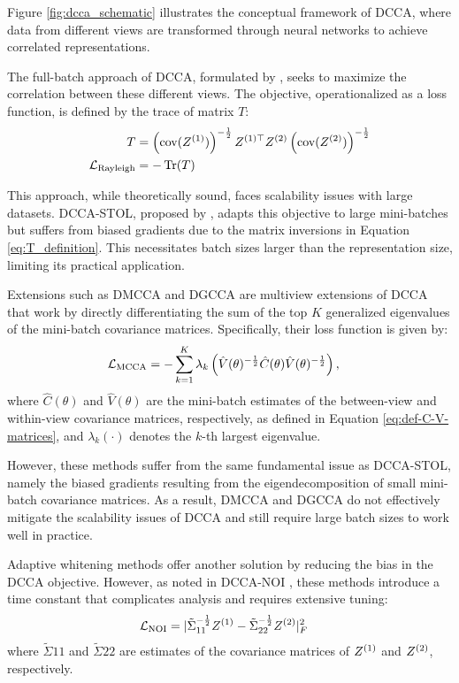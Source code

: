 Figure \ref{fig:dcca_schematic} illustrates the conceptual framework of DCCA, where data from different views are transformed through neural networks to achieve correlated representations.

The full-batch approach of DCCA, formulated by \citet{andrew2013deep}, seeks to maximize the correlation between these different views.
The objective, operationalized as a loss function, is defined by the trace of matrix $T$:
\begin{align}\label{eq:T_definition}
T &= \left(\text{cov}(Z^{(1)})\right)^{-\frac{1}{2}} Z^{(1)\top} Z^{(2)} \left(\text{cov}(Z^{(2)})\right)^{-\frac{1}{2}} \\
\mathcal{L}_\text{Rayleigh} &= -\operatorname{Tr}(T)
\end{align}

This approach, while theoretically sound, faces scalability issues with large datasets.
DCCA-STOL, proposed by \citet{wang2015unsupervised}, adapts this objective to large mini-batches but suffers from biased gradients due to the matrix inversions in Equation \eqref{eq:T_definition}.
This necessitates batch sizes larger than the representation size, limiting its practical application.

Extensions such as DMCCA \citep{somandepalli2019multimodal} and DGCCA \citep{benton2017deep} are multiview extensions of DCCA that work by directly differentiating the sum of the top $K$ generalized eigenvalues of the mini-batch covariance matrices. Specifically, their loss function is given by:
\begin{align}
    \mathcal{L}_\text{MCCA} &= -\sum_{k=1}^K \lambda_k\left(\hat{V}(\theta)^{-\frac{1}{2}} \hat{C}(\theta)\hat{V}(\theta)^{-\frac{1}{2}}\right),
\end{align}
    where $\hat{C}(\theta)$ and $\hat{V}(\theta)$ are the mini-batch estimates of the between-view and within-view covariance matrices, respectively, as defined in Equation \eqref{eq:def-C-V-matrices}, and $\lambda_k(\cdot)$ denotes the $k$-th largest eigenvalue.

However, these methods suffer from the same fundamental issue as DCCA-STOL, namely the biased gradients resulting from the eigendecomposition of small mini-batch covariance matrices. As a result, DMCCA and DGCCA do not effectively mitigate the scalability issues of DCCA and still require large batch sizes to work well in practice.

Adaptive whitening methods \citep{wang2015stochastic, chang2018scalable} offer another solution by reducing the bias in the DCCA objective.
However, as noted in DCCA-NOI \citep{wang2015unsupervised}, these methods introduce a time constant that complicates analysis and requires extensive tuning:
\begin{align}
\mathcal{L}_\text{NOI} &= |{\tilde{\Sigma}_{11}}^{-\frac{1}{2}} Z^{(1)}-{\tilde{\Sigma}_{22}}^{-\frac{1}{2}} Z^{(2)}|^2_F
\end{align}
where $\tilde{\Sigma}{11}$ and $\tilde{\Sigma}{22}$ are estimates of the covariance matrices of $Z^{(1)}$ and $Z^{(2)}$, respectively.

